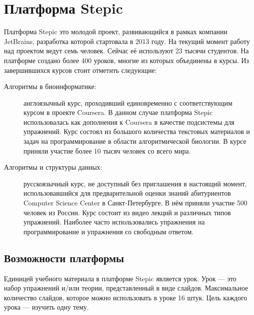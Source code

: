 \documentclass{matmex-diploma-custom}
\begin{document}
\section{Платформа Stepic}

Платформа Stepic \cite{stepic} это молодой проект, развивающийся в
рамках компании JetBrains, разработка которой стартовала в 2013
году. На текущий момент работу над проектом ведут семь человек. Сейчас
её используют 23 тысячи студентов. На платформе создано более 400
уроков, многие из которых объединены в курсы. Из завершившихся курсов
стоит отметить следующие:

\begin{description}
\item[Алгоритмы в биоинформатике:] англоязычный курс, проходивший
  единовременно с соответствующим курсом в проекте Coursera. В данном
  случае платформа Stepic использовалась как дополнения к Coursera в
  качестве подсистемы для упражнений. Курс состоял из большого
  количества текстовых материалов и задач на программирование в
  области алгоритмической биологии. В курсе приняли участие более 10
  тысяч человек со всего мира.

\item[Алгоритмы и структуры данных:] русскоязычный курс, не доступный
  без приглашения в настоящий момент, использовавшийся для
  предварительной оценки знаний абитуриентов Computer Science Center в
  Санкт-Петербурге. В нём приняли участие 500 человек из России. Курс
  состоит из видео лекций и различных типов упражнений. Наиболее часто
  использовались упражнения на программирование и упражнения со
  свободным ответом.
\end{description}

\subsection{Возможности платформы}
Единицей учебного материала в платформе Stepic является урок. Урок ---
это набор упражнений и/или теории, представленный в виде
слайдов. Максимальное количество слайдов, которое можно использовать в
уроке 16 штук. Цель каждого урока --- изучить одну тему.
\end{document}
